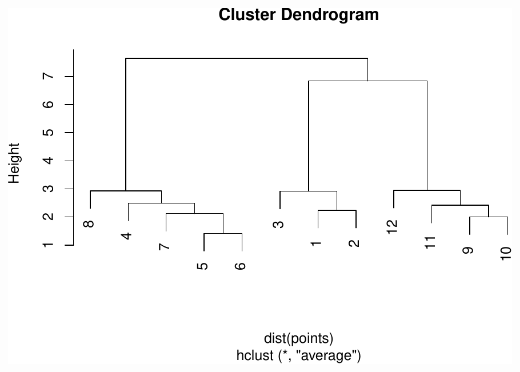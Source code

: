 \documentclass[]{article}
\begin{document}
\includegraphics{arancibia_week8_hw_files/figure-latex/unnamed-chunk-4-1.pdf}
\end{document}
